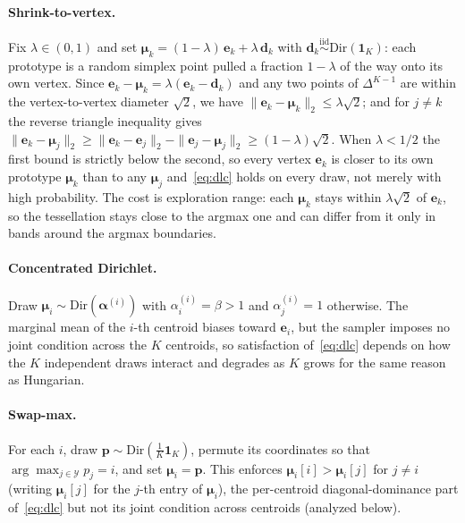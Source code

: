 \paragraph{Shrink-to-vertex.} Fix $\lambda \in (0,1)$ and set $\boldsymbol{\mu}_k = (1-\lambda)\,\mathbf{e}_k + \lambda\,\mathbf{d}_k$ with $\mathbf{d}_k \overset{\mathrm{iid}}{\sim} \mathrm{Dir}(\mathbf{1}_K)$: each prototype is a random simplex point pulled a fraction $1-\lambda$ of the way onto its own vertex. Since $\mathbf{e}_k - \boldsymbol{\mu}_k = \lambda(\mathbf{e}_k - \mathbf{d}_k)$ and any two points of $\Delta^{K-1}$ are within the vertex-to-vertex diameter $\sqrt{2}$, we have $\|\mathbf{e}_k - \boldsymbol{\mu}_k\|_2 \leq \lambda\sqrt{2}$; and for $j \neq k$ the reverse triangle inequality gives $\|\mathbf{e}_k - \boldsymbol{\mu}_j\|_2 \geq \|\mathbf{e}_k - \mathbf{e}_j\|_2 - \|\mathbf{e}_j - \boldsymbol{\mu}_j\|_2 \geq (1-\lambda)\sqrt{2}$. When $\lambda < 1/2$ the first bound is strictly below the second, so every vertex $\mathbf{e}_k$ is closer to its own prototype $\boldsymbol{\mu}_k$ than to any $\boldsymbol{\mu}_j$ and~\eqref{eq:dlc} holds on every draw, not merely with high probability. The cost is exploration range: each $\boldsymbol{\mu}_k$ stays within $\lambda\sqrt{2}$ of $\mathbf{e}_k$, so the tessellation stays close to the argmax one and can differ from it only in bands around the argmax boundaries.

\paragraph{Concentrated Dirichlet.} Draw $\boldsymbol{\mu}_i \sim \mathrm{Dir}(\boldsymbol{\alpha}^{(i)})$ with $\alpha^{(i)}_i = \beta > 1$ and $\alpha^{(i)}_j = 1$ otherwise. The marginal mean of the $i$-th centroid biases toward $\mathbf{e}_i$, but the sampler imposes no joint condition across the $K$ centroids, so satisfaction of~\eqref{eq:dlc} depends on how the $K$ independent draws interact and degrades as $K$ grows for the same reason as Hungarian.

\paragraph{Swap-max.} For each $i$, draw $\mathbf{p} \sim \mathrm{Dir}(\tfrac{1}{K}\mathbf{1}_K)$, permute its coordinates so that $\arg\max_{j \in \mathcal{Y}} p_j = i$, and set $\boldsymbol{\mu}_i = \mathbf{p}$. This enforces $\boldsymbol{\mu}_i[i] > \boldsymbol{\mu}_i[j]$ for $j \neq i$ (writing $\boldsymbol{\mu}_i[j]$ for the $j$-th entry of $\boldsymbol{\mu}_i$), the per-centroid diagonal-dominance part of~\eqref{eq:dlc} but not its joint condition across centroids (analyzed below).

